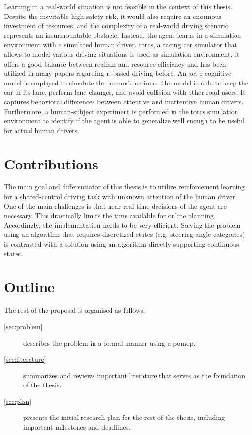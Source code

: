 Learning in a real-world situation is not feasible in the context of this thesis. Despite the inevitable high safety risk, it would also require an enormous investment of resources, and the complexity of a real-world driving scenario represents an insurmountable obstacle. Instead, the agent learns in a simulation environment with a simulated human driver. \gls{torcs}, a racing car simulator that allows to model various driving situations \parencite{torcs} is used as simulation environment. It offers a good balance between realism and resource efficiency and has been utilized in many papers regarding \gls{rl}-based driving before. An \gls{act-r} cognitive model is employed to simulate the human's actions. The model is able to keep the car in its lane, perform lane changes, and avoid collision with other road users. It captures behavioral differences between attentive and inattentive human drivers. Furthermore, a human-subject experiment is performed in the \gls{torcs} simulation environment to identify if the agent is able to generalize well enough to be useful for actual human drivers.

\section{Contributions}


The main goal and differentiator of this thesis is to utilize reinforcement learning for a shared-control driving task with unknown attention of the human driver. One of the main challenges is that near real-time decisions of the agent are necessary. This drastically limits the time available for online planning. Accordingly, the implementation needs to be very efficient. Solving the problem using an algorithm that requires discretized states (e.g. steering angle categories) is contrasted with a solution using an algorithm directly supporting continuous states.


\section{Outline}

The rest of the proposal is organised as follows:
\begin{description}
    \item[\cref{sec:problem}]
    describes the problem in a formal manner using a \gls{pomdp}.
    
    \item[\cref{sec:literature}]
    summarizes and reviews important literature that serves as the foundation of the thesis.
    
    \item[\cref{sec:plan}]
    presents the initial research plan for the rest of the thesis, including important milestones and deadlines.
\end{description}



